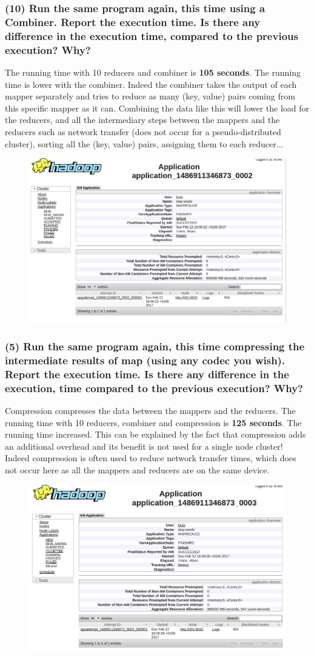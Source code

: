 \documentclass[a4paper,10pt]{article}
\begin{document}
\subsubsection{(10) Run the same program again, this time using a Combiner. Report the
execution time. Is there any difference in the execution time, compared to
the previous execution? Why?}
The running time with 10 reducers and combiner is \textbf{105 seconds}.
The running time is lower with the combiner. Indeed the combiner takes the output
of each mapper separately and tries to reduce as many (key, value) pairs coming
from this specific mapper as it can.
Combining the data like this will lower the load for the reducers, and all the
intermediary steps between the mappers and the reducers such as network transfer
(does not occur for a pseudo-distributed cluster), sorting all the (key, value)
pairs, assigning them to each reducer...
\begin{figure}[H]
  \centering
  \includegraphics[width=.6\textwidth]{stopwords_10_reducers_1_combiner.png}
\end{figure}

\subsubsection{(5) Run the same program again, this time compressing the intermediate
results of map (using any codec you wish). Report the execution time. Is there
any difference in the execution, time compared to the previous execution?
Why?}
Compression compresses the data between the mappers and the reducers.
The running time with 10 reducers, combiner and compression is \textbf{125 seconds}.
The running time increased. This can be explained by the fact that compression adds
an additional overhead and its benefit is not used for a single node cluster!
Indeed compression is often used to reduce network transfer times, which does not
occur here as all the mappers and reducers are on the same device.
\begin{figure}[H]
  \centering
  \includegraphics[width=.6\textwidth]{stopwords_10_reducers_1_combiner_compression.png}
\end{figure}
\end{document}
